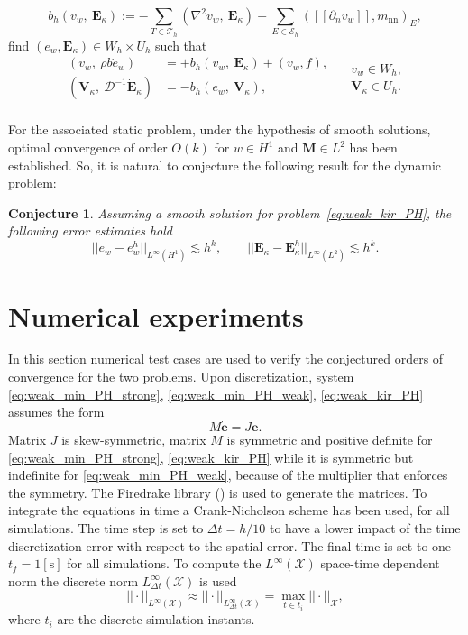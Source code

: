 \documentclass{ifacconf}
\newtheorem{conjecture}{Conjecture}
\begin{document}
\[
b_h(v_w, \ \bm{E}_{\kappa}) := - \sum_{T \in \mathcal{T}_h} ( \nabla^2 v_w, \ \bm{E}_\kappa) + \sum_{E \in \mathcal{E}_h} ([\![\partial_n v_w]\!], m_{\text{nn}})_{E}, 
\]
find $(e_w, \bm{E}_\kappa) \in W_h \times U_h$ such that
\begin{equation}
\label{eq:weak_kir_PH}
\begin{aligned}
(v_w, \ \rho b \dot{e}_w) &= +b_h(v_w, \ \bm{E}_{\kappa}) + (v_w, f), \\ 
(\bm{V}_\kappa, \ \mathcal{D}^{-1} \dot{\bm{E}}_\kappa) &= -b_h(e_w, \ \bm{V}_{\kappa}), \\ 
\end{aligned} \quad
\begin{aligned}
v_w \in W_h, \\
\bm{V}_\kappa \in U_h. \\
\end{aligned}
\end{equation}

For the associated static problem, under the hypothesis of smooth solutions, optimal convergence of order $O(k)$ for $w \in H^1$ and $\bm{M} \in L^2$ has been established. So, it is natural to conjecture the following result for the dynamic problem:
\begin{conjecture}
Assuming a smooth solution for problem~\eqref{eq:weak_kir_PH}, the following error estimates hold
\begin{equation}
\label{eq:errHHJ}
||e_w - e_w^h||_{L^{\infty} (H^1)} \lesssim h^{k}, \qquad
||\bm{E}_\kappa - \bm{E}_\kappa^h||_{L^{\infty} (L^2)} \lesssim h^{k}.
\end{equation}
\end{conjecture}


\section{Numerical experiments}
\label{sec:numerics}
In this section numerical test cases are used to verify the conjectured orders of convergence for the two problems. Upon discretization, system \eqref{eq:weak_min_PH_strong}, \eqref{eq:weak_min_PH_weak}, \eqref{eq:weak_kir_PH} assumes the form 
\[
M \dot{\bm{e}} = J \bm{e}.
\]
Matrix $J$ is skew-symmetric, matrix $M$ is symmetric and positive definite for \eqref{eq:weak_min_PH_strong}, \eqref{eq:weak_kir_PH} while it is symmetric but indefinite for \eqref{eq:weak_min_PH_weak}, because of the multiplier that enforces the symmetry. The Firedrake library (\cite{rathgeber2017firedrake}) is used to generate the matrices. To integrate the equations in time a Crank-Nicholson scheme has been used, for all simulations. The time step is set to $\Delta t = h/10$ to have a lower impact of the time discretization error with respect to the spatial error. The final time is set to one $t_f = 1 [\textrm{s}]$ for all simulations. To compute the $L^\infty (\mathcal{X})$ space-time dependent norm  the discrete norm $L^\infty_{\Delta t} (\mathcal{X})$ is used
\[
||\cdot ||_{L^\infty (\mathcal{X})} \approx || \cdot ||_{L^\infty_{\Delta t} (\mathcal{X})} = \max_{t \in t_i} ||\cdot||_{\mathcal{X}},
\]
where $t_i$ are the discrete simulation instants. 
\end{document}
